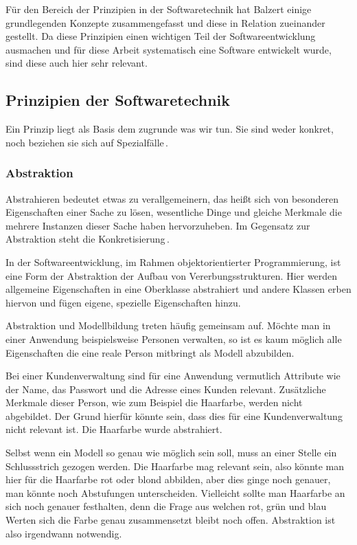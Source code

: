 \documentclass[12pt,oneside,a4paper,parskip]{scrbook}
\begin{document}
Für den Bereich der Prinzipien in der Softwaretechnik hat Balzert einige grundlegenden Konzepte zusammengefasst und diese in Relation zueinander gestellt. Da diese Prinzipien einen wichtigen Teil der Softwareentwicklung ausmachen und für diese Arbeit systematisch eine Software entwickelt wurde, sind diese auch hier sehr relevant.

\subsection{Prinzipien der Softwaretechnik}

Ein Prinzip liegt als Basis dem zugrunde was wir tun. Sie sind weder konkret, noch beziehen sie sich auf Spezialfälle\,\cite[S. 25]{balzert2009a}. 

\subsubsection{Abstraktion}

Abstrahieren bedeutet etwas zu verallgemeinern, das heißt sich von besonderen Eigenschaften einer Sache zu lösen, wesentliche Dinge und gleiche Merkmale die mehrere Instanzen dieser Sache haben hervorzuheben. Im Gegensatz zur Abstraktion steht die Konkretisierung\,\cite[S. 26]{balzert2009a}.

In der Softwareentwicklung, im Rahmen objektorientierter Programmierung, ist eine Form der Abstraktion der Aufbau von Vererbungsstrukturen. Hier werden allgemeine Eigenschaften in eine Oberklasse abstrahiert und andere Klassen erben hiervon und fügen eigene, spezielle Eigenschaften hinzu.

Abstraktion und Modellbildung treten häufig gemeinsam auf. Möchte man in einer Anwendung beispielsweise Personen verwalten, so ist es kaum möglich alle Eigenschaften die eine reale Person mitbringt als Modell abzubilden. 

Bei einer Kundenverwaltung sind für eine Anwendung vermutlich Attribute wie der Name, das Passwort und die Adresse eines Kunden relevant. Zusätzliche Merkmale dieser Person, wie zum Beispiel die Haarfarbe, werden nicht abgebildet. Der Grund hierfür könnte sein, dass dies für eine Kundenverwaltung nicht relevant ist. Die Haarfarbe wurde abstrahiert.

Selbst wenn ein Modell so genau wie möglich sein soll, muss an einer Stelle ein Schlussstrich gezogen werden. Die Haarfarbe mag relevant sein, also könnte man hier für die Haarfarbe rot oder blond abbilden, aber dies ginge noch genauer, man könnte noch Abstufungen unterscheiden. Vielleicht sollte man Haarfarbe an sich noch genauer festhalten, denn die Frage aus welchen rot, grün und blau Werten sich die Farbe genau zusammensetzt bleibt noch offen. Abstraktion ist also irgendwann notwendig.
\end{document}
